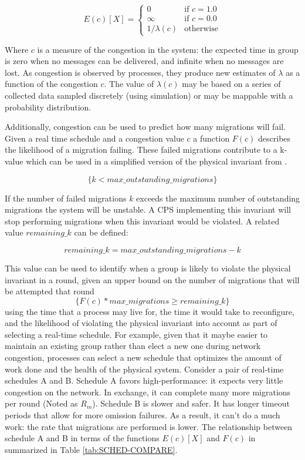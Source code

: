 \begin{equation}
E(c)[X] = \begin{cases}
0 & \text{if } c = 1.0 \\
\infty & \text{if } c = 0.0 \\
1 / \lambda(c) & \text{otherwise}
\end{cases}
\end{equation}

Where $c$ is a measure of the congestion in the system: the expected time in group is zero when no messages can be delivered, and infinite when no messages are lost.
As congestion is observed by processes, they produce new estimates of $\lambda$ as a function of the congestion $c$.
The value of $\lambda(c)$ may be based on a series of collected data sampled discretely (using simulation) or may be mappable with a probability distribution.

Additionally, congestion can be used to predict how many migrations will fail.
Given a real time schedule and a congestion value $c$ a function $F(c)$ describes the likelihood of a migration failing.
These failed migrations contribute to a k-value which can be used in a simplified version of the physical invariant from \cite{HARINI}\cite{CPS1}\cite{CPS2}.

\begin{equation}
\{ k < max\_outstanding\_migrations \}
\end{equation}

If the number of failed migrations $k$ exceeds the maximum number of outstanding migrations the system will be unstable.
A CPS implementing this invariant will stop performing migrations when this invariant would be violated.
A related value $remaining\_k$ can be defined:

\begin{equation}
remaining\_k = max\_outstanding\_migrations - k
\end{equation}  

This value can be used to identify when a group is likely to violate the physical invariant in a round, given an upper bound on the number of migrations that will be attempted that round
\begin{equation}
\{ F(c) * max\_migrations \geq remaining\_k \}
\end{equation}
using the time that a process may live for, the time it would take to reconfigure, and the likelihood of violating the physical invariant into account as part of selecting a real-time schedule.
For example, given that it maybe easier to maintain an existing group rather than elect a new one during network congestion, processes can select a new schedule that optimizes the amount of work done and the health of the physical system.
Consider a pair of real-time schedules A and B.
Schedule A favors high-performance: it expects very little congestion on the network.
In exchange, it can complete many more migrations per round (Noted as $R_{m}$).
Schedule B is slower and safer.
It has longer timeout periods that allow for more omission failures.
As a result, it can't do a much work: the rate that migrations are performed is lower.
The relationship between schedule A and B in terms of the functions $E(c)[X]$ and $F(c)$ in summarized in Table \ref{tab:SCHED-COMPARE}.

